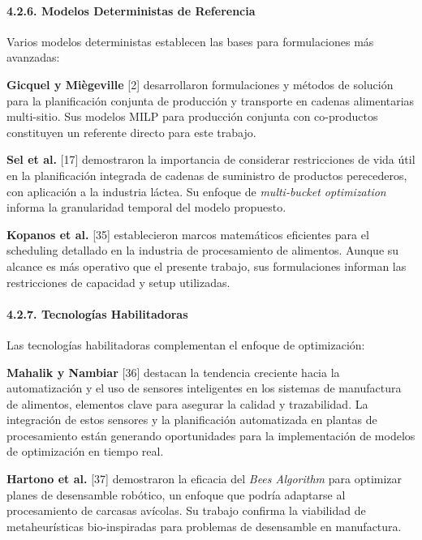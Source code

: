 \documentclass[
  spanish,
  12pt,
]{article}
\begin{document}
\paragraph{4.2.6. Modelos Deterministas de
Referencia}\label{modelos-deterministas-de-referencia}

Varios modelos deterministas establecen las bases para formulaciones más
avanzadas:

\textbf{Gicquel y Miègeville} {[}2{]} desarrollaron formulaciones y
métodos de solución para la planificación conjunta de producción y
transporte en cadenas alimentarias multi-sitio. Sus modelos MILP para
producción conjunta con co-productos constituyen un referente directo
para este trabajo.

\textbf{Sel et al.} {[}17{]} demostraron la importancia de considerar
restricciones de vida útil en la planificación integrada de cadenas de
suministro de productos perecederos, con aplicación a la industria
láctea. Su enfoque de \emph{multi-bucket optimization} informa la
granularidad temporal del modelo propuesto.

\textbf{Kopanos et al.} {[}35{]} establecieron marcos matemáticos
eficientes para el scheduling detallado en la industria de procesamiento
de alimentos. Aunque su alcance es más operativo que el presente
trabajo, sus formulaciones informan las restricciones de capacidad y
setup utilizadas.

\paragraph{4.2.7. Tecnologías
Habilitadoras}\label{tecnologuxedas-habilitadoras}

Las tecnologías habilitadoras complementan el enfoque de optimización:

\textbf{Mahalik y Nambiar} {[}36{]} destacan la tendencia creciente
hacia la automatización y el uso de sensores inteligentes en los
sistemas de manufactura de alimentos, elementos clave para asegurar la
calidad y trazabilidad. La integración de estos sensores y la
planificación automatizada en plantas de procesamiento están generando
oportunidades para la implementación de modelos de optimización en
tiempo real.

\textbf{Hartono et al.} {[}37{]} demostraron la eficacia del \emph{Bees
Algorithm} para optimizar planes de desensamble robótico, un enfoque que
podría adaptarse al procesamiento de carcasas avícolas. Su trabajo
confirma la viabilidad de metaheurísticas bio-inspiradas para problemas
de desensamble en manufactura.
\end{document}
